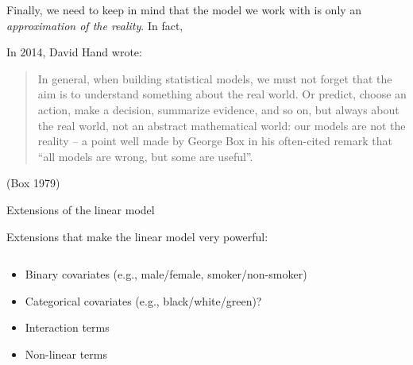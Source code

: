 \documentclass[10pt,ignorenonframetext,]{beamer}
\providecommand{\tightlist}{%
  \setlength{\itemsep}{0pt}\setlength{\parskip}{0pt}}
\begin{document}
\begin{frame}

Finally, we need to keep in mind that the model we work with is only an
\emph{approximation of the reality}. In fact,

\vspace{4mm}

In 2014, David Hand wrote:

\vspace{4mm}

\begin{quote}
In general, when building statistical models, we must
not forget that the aim is to understand something about
the real world. Or predict, choose an action, make
a decision, summarize evidence, and so on, but always
about the real world, not an abstract mathematical
world: our models are not the reality -- a point well
made by George Box in his often-cited remark that
``all models are wrong, but some are useful''.
\end{quote}

(Box 1979)

\end{frame}

\begin{frame}{Extensions of the linear model}
\protect\hypertarget{extensions-of-the-linear-model}{}

Extensions that make the linear model very powerful:

\(~\)

\begin{itemize}
\tightlist
\item
  Binary covariates (e.g., male/female, smoker/non-smoker)
\end{itemize}

\vspace{2mm}

\begin{itemize}
\tightlist
\item
  Categorical covariates (e.g., black/white/green)?
\end{itemize}

\vspace{2mm}

\begin{itemize}
\tightlist
\item
  Interaction terms
\end{itemize}

\vspace{2mm}

\begin{itemize}
\tightlist
\item
  Non-linear terms
\end{itemize}

\end{frame}
\end{document}

